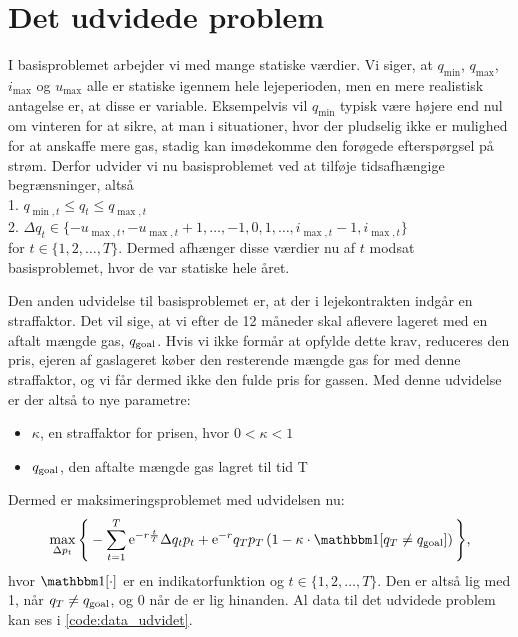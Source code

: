 \section{Det udvidede problem} \label{kap:udvidet_problem}

I basisproblemet arbejder vi med mange statiske værdier. Vi siger, at $q_{\min}$, $q_{\max}$, $i_{\max}$ og $u_{\max}$ alle er statiske igennem hele lejeperioden, men en mere realistisk antagelse er, at disse er variable. Eksempelvis vil $q_{\min}$ typisk være højere end nul om vinteren for at sikre, at man i situationer, hvor der pludselig ikke er mulighed for at anskaffe mere gas, stadig kan imødekomme den forøgede efterspørgsel på strøm. Derfor udvider vi nu basisproblemet ved at tilføje tidsafhængige begrænsninger, altså\\
1. $q_{\min,t} \leq q_{t} \leq q_{\max,t}$ \\
2. $\Delta q_{t} \in \{-u_{\max,t}, -u_{\max,t} + 1, \dotsc, -1, 0, 1, \dotsc, i_{\max,t} -1, i_{\max,t} \}$ \\
for $t \in \{1,2,\dotsc,T \}$. Dermed afhænger disse værdier nu af $t$ modsat basisproblemet, hvor de var statiske hele året. 

Den anden udvidelse til basisproblemet er, at der i lejekontrakten indgår en straffaktor. Det vil sige, at vi efter de 12 måneder skal aflevere lageret med en aftalt mængde gas, $q_{\textrm{goal}}$. Hvis vi ikke formår at opfylde dette krav, reduceres den pris, ejeren af gaslageret køber den resterende mængde gas for med denne straffaktor, og vi får dermed ikke den fulde pris for gassen. Med denne udvidelse er der altså to nye parametre:
\begin{itemize}
\item $\kappa$, en straffaktor for prisen, hvor $0 < \kappa < 1$
\item $q_{\textrm{goal}}$, den aftalte mængde gas lagret til tid T
\end{itemize}
Dermed er maksimeringsproblemet med udvidelsen nu:
\begin{equation}
\max_{\Delta p_{t}} \Bigg\{ -\sum_{t=1}^{T} \mathrm{e}^{-r\frac{t}{T}} \Delta q_{t} p_{t}+ \mathrm{e}^{-r}q_{T}p_{T} \left (1- \kappa \cdot \ind [q_{T} \neq q_{\goal}] \right )  \Bigg\}, 
\end{equation}
hvor $\ind [\cdot]$ er en indikatorfunktion og $t \in \{1,2,\dotsc,T \}$. Den er altså lig med 1, når $q_{T} \neq q_{\textrm{goal}}$, og 0 når de er lig hinanden. Al data til det udvidede problem kan ses i \autoref{code:data_udvidet}.